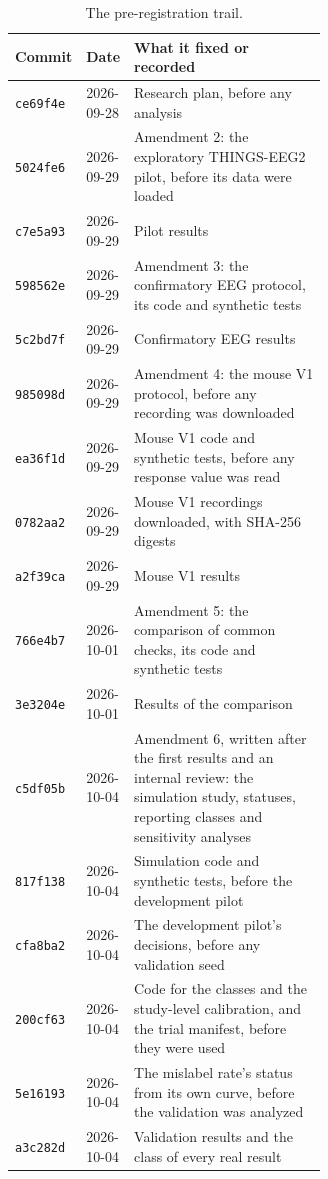 \documentclass[11pt]{article}
\begin{document}
\begin{table}[!htb]
\centering\small
\caption{The pre-registration trail.}
\begin{tabular}{llp{0.62\linewidth}}
\toprule
Commit & Date & What it fixed or recorded \\
\midrule
\texttt{ce69f4e} & 2026-09-28 & Research plan, before any analysis \\
\texttt{5024fe6} & 2026-09-29 & Amendment 2: the exploratory THINGS-EEG2 pilot, before its data were loaded \\
\texttt{c7e5a93} & 2026-09-29 & Pilot results \\
\texttt{598562e} & 2026-09-29 & Amendment 3: the confirmatory EEG protocol, its code and synthetic tests \\
\texttt{5c2bd7f} & 2026-09-29 & Confirmatory EEG results \\
\texttt{985098d} & 2026-09-29 & Amendment 4: the mouse V1 protocol, before any recording was downloaded \\
\texttt{ea36f1d} & 2026-09-29 & Mouse V1 code and synthetic tests, before any response value was read \\
\texttt{0782aa2} & 2026-09-29 & Mouse V1 recordings downloaded, with SHA-256 digests \\
\texttt{a2f39ca} & 2026-09-29 & Mouse V1 results \\
\texttt{766e4b7} & 2026-10-01 & Amendment 5: the comparison of common checks, its code and synthetic tests \\
\texttt{3e3204e} & 2026-10-01 & Results of the comparison \\
\texttt{c5df05b} & 2026-10-04 & Amendment 6, written after the first results and an internal review: the simulation study, statuses, reporting classes and sensitivity analyses \\
\texttt{817f138} & 2026-10-04 & Simulation code and synthetic tests, before the development pilot \\
\texttt{cfa8ba2} & 2026-10-04 & The development pilot's decisions, before any validation seed \\
\texttt{200cf63} & 2026-10-04 & Code for the classes and the study-level calibration, and the trial manifest, before they were used \\
\texttt{5e16193} & 2026-10-04 & The mislabel rate's status from its own curve, before the validation was analyzed \\
\texttt{a3c282d} & 2026-10-04 & Validation results and the class of every real result \\

\end{tabular}
\end{table}
\end{document}
